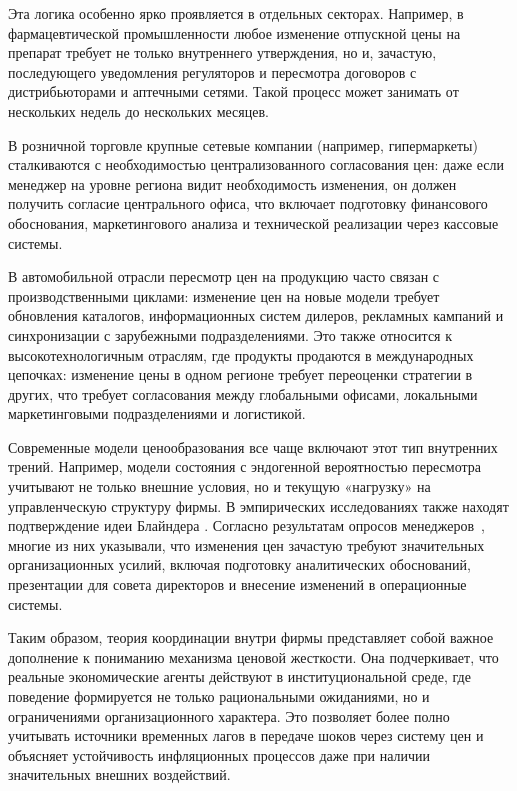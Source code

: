 Эта логика особенно ярко проявляется в отдельных секторах. Например, в фармацевтической промышленности любое изменение отпускной цены на препарат требует не только внутреннего утверждения, но и, зачастую, последующего уведомления регуляторов и пересмотра договоров с дистрибьюторами и аптечными сетями. Такой процесс может занимать от нескольких недель до нескольких месяцев.

В розничной торговле крупные сетевые компании (например, гипермаркеты) сталкиваются с необходимостью централизованного согласования цен: даже если менеджер на уровне региона видит необходимость изменения, он должен получить согласие центрального офиса, что включает подготовку финансового обоснования, маркетингового анализа и технической реализации через кассовые системы.

В автомобильной отрасли пересмотр цен на продукцию часто связан с производственными циклами: изменение цен на новые модели требует обновления каталогов, информационных систем дилеров, рекламных кампаний и синхронизации с зарубежными подразделениями. Это также относится к высокотехнологичным отраслям, где продукты продаются в международных цепочках: изменение цены в одном регионе требует переоценки стратегии в других, что требует согласования между глобальными офисами, локальными маркетинговыми подразделениями и логистикой.

Современные модели ценообразования все чаще включают этот тип внутренних трений. Например, модели состояния с эндогенной вероятностью пересмотра учитывают не только внешние условия, но и текущую «нагрузку» на управленческую структуру фирмы. В эмпирических исследованиях также находят подтверждение идеи Блайндера \cite{Blinder1991}. Согласно результатам опросов менеджеров~\cite{BlinderEtAl1998}, многие из них указывали, что изменения цен зачастую требуют значительных организационных усилий, включая подготовку аналитических обоснований, презентации для совета директоров и внесение изменений в операционные системы.

Таким образом, теория координации внутри фирмы представляет собой важное дополнение к пониманию механизма ценовой жесткости. Она подчеркивает, что реальные экономические агенты действуют в институциональной среде, где поведение формируется не только рациональными ожиданиями, но и ограничениями организационного характера. Это позволяет более полно учитывать источники временных лагов в передаче шоков через систему цен и объясняет устойчивость инфляционных процессов даже при наличии значительных внешних воздействий.


